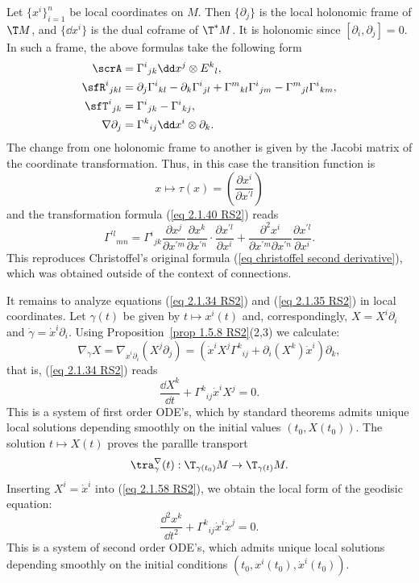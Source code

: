 \begin{rem}\label{rem 2.1.29 RS2}
    Let $\{x^i\}_{i=1}^n$ be local coordinates on $M$. Then $\{\partial_j\}$ is the local holonomic frame of $\T M$, and $\{\dd x^i\}$ is the dual coframe of $\T^\ast M$. It is holonomic since $[\partial_i,\partial_j]=0$. In such a frame, the above formulas take the following form 
    \begin{align}
        \scrA&=\Gamma^i{}_{jk}\dd x^j\otimes E^k{}_l,\\
        \sfR^i{}_{jkl}&=\partial_j\Gamma^i{}_{kl}-\partial_k\Gamma^i{}_{jl}+\Gamma^m{}_{kl}\Gamma^i{}_{jm}-\Gamma^m{}_{jl}\Gamma^i{}_{km},\\
        \sfT^i{}_{jk}&=\Gamma^i{}_{jk}-\Gamma^i{}_{kj},\\
        \nabla\partial_j&=\Gamma^k{}_{ij}\dd x^i\otimes\partial_k.
    \end{align}
    The change from one holonomic frame to another is given by the Jacobi matrix of the coordinate transformation. Thus, in this case the transition function is 
    \[x\mapsto \tau(x)=\left(\frac{\partial x^i}{\partial x^{\prime l}}\right)\]
    and the transformation formula (\ref{eq 2.1.40 RS2}) reads 
    \[\Gamma^{\prime l}{}_{mn}=
    \Gamma^i{}_{jk}\frac{\partial x^j}{\partial x^{\prime m}}  \frac{\partial x^k}{\partial x^{\prime n}}\cdot \frac{\partial x^{\prime l}}{\partial x^i}+
    \frac{\partial^2 x^i}{\partial x^{\prime m}\partial x^{\prime n}}\frac{\partial x^{\prime l}}{\partial x^i}.
    \]
    This reproduces Christoffel's original formula (\ref{eq christoffel second derivative}), which was obtained outside of the context of connections.
\end{rem}


It remains to analyze equations (\ref{eq 2.1.34 RS2}) and (\ref{eq 2.1.35 RS2}) in local coordinates. Let $\gamma(t)$ be given by $t\mapsto x^i(t)$ and, correspondingly, $X=X^i\partial_i$ and $\dot\gamma=\dot x^i\partial_i$. Using Proposition~\ref{prop 1.5.8 RS2}(2,3) we calculate:
\[\nabla_{\dot\gamma}X=\nabla_{\dot x^i\partial_i}(X^j\partial_j)=(\dot x^iX^j\Gamma^k{}_{ij}+\partial_i(X^k)\dot x^i)\partial_k,\]
that is, (\ref{eq 2.1.34 RS2}) reads 
\[\frac{\dd X^k}{\dd t}+\Gamma^k{}_{ij}\dot x^i X^j=0.\label{eq 2.1.58 RS2}\]
This is a system of first order ODE's, which by standard theorems admits unique local solutions depending smoothly on the initial values $(t_0,X(t_0))$. The solution $t\mapsto X(t)$ proves the parallle transport 
\[\tra_{\gamma}^{\nabla}(t):\T_{\gamma(t_0)}M\to \T_{\gamma(t)}M.\]
Inserting $X^i=\dot x^i$ into (\ref{eq 2.1.58 RS2}), we obtain the local form of the geodisic equation:
\[\frac{\dd^2 x^k}{\dd t^2}+\Gamma^k{}_{ij}\dot x^i\dot x^j=0.\]
This is a system of second order ODE's, which admits unique local solutions depending smoothly on the initial conditions $(t_0,x^i(t_0),\dot x^i(t_0))$.

